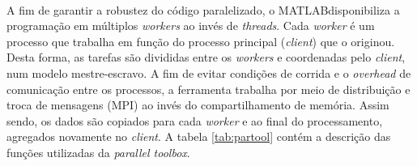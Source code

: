 \documentclass[
    12pt,               %
    openright,          %
    oneside,
    a4paper,            %
    english,            %
    french,             %
    spanish,            %
    brazil              %
    ]{abntex2}
\newcommand{\matlab}{MATLAB\textsuperscript{\textregistered}}
\begin{document}
A fim de garantir a robustez do código paralelizado, o \matlab disponibiliza a programação em múltiplos \textit{workers} ao invés de \textit{threads}. Cada \textit{worker} é um processo que trabalha em função do processo principal (\textit{client}) que o originou. Desta forma, as tarefas são divididas entre os \textit{workers} e coordenadas pelo \textit{client}, num modelo mestre-escravo. A fim de evitar condições de corrida e o \textit{overhead} de comunicação entre os processos, a ferramenta trabalha por meio de distribuição e troca de mensagens (MPI) ao invés do compartilhamento de memória. Assim sendo, os dados são copiados para cada \textit{worker} e ao final do processamento, agregados novamente no \textit{client}. A tabela \ref{tab:partool} contém a descrição das funções utilizadas da \textit{parallel toolbox}.
\end{document}
